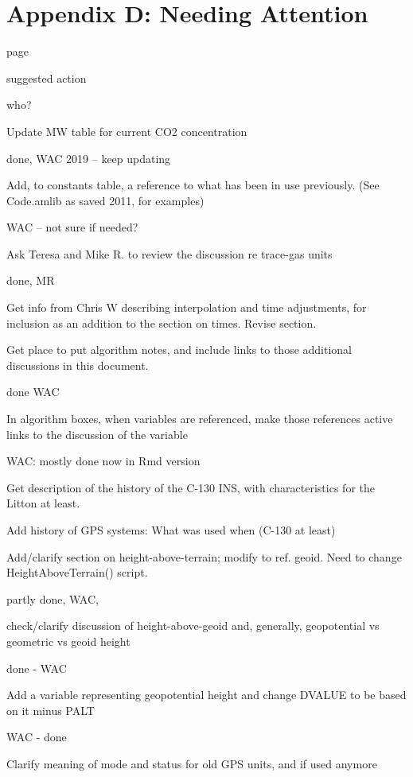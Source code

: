 \documentclass[
  english,
]{book}
\begin{document}
\hypertarget{appendix-d-needing-attention}{%
\chapter*{Appendix D: Needing
Attention}\label{appendix-d-needing-attention}}

page

suggested action

who?

Update MW table for current CO2 concentration

done, WAC 2019 -- keep updating

Add, to constants table, a reference to what has been in use previously.
(See Code.amlib as saved 2011, for examples)

WAC -- not sure if needed?

Ask Teresa and Mike R. to review the discussion re trace-gas units

done, MR

Get info from Chris W describing interpolation and time adjustments, for
inclusion as an addition to the section on times. Revise section.

Get place to put algorithm notes, and include links to those additional
discussions in this document.

done WAC

In algorithm boxes, when variables are referenced, make those references
active links to the discussion of the variable

WAC: mostly done now in Rmd version

Get description of the history of the C-130 INS, with characteristics
for the Litton at least.

Add history of GPS systems: What was used when (C-130 at least)

Add/clarify section on height-above-terrain; modify to ref. geoid. Need
to change HeightAboveTerrain() script.

partly done, WAC,

check/clarify discussion of height-above-geoid and, generally,
geopotential vs geometric vs geoid height

done - WAC

Add a variable representing geopotential height and change DVALUE to be
based on it minus PALT

WAC - done

Clarify meaning of mode and status for old GPS units, and if used
anymore
\end{document}
